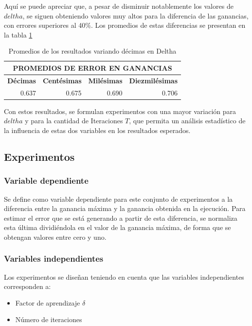 Aquí se puede apreciar que, a pesar de disminuir notablemente los valores de $deltha$, se siguen obteniendo valores muy altos para la diferencia de las ganancias, con errores superiores al 40\%. Los promedios de estas diferencias se presentan en la tabla \ref{delthas_0000}

\begin{table}[H]
\centering
\caption{Promedios de los resultados variando décimas en Deltha}
\begin{tabular}{llll} \\ \hline  
\multicolumn{4}{c}{\textbf{PROMEDIOS DE ERROR EN GANANCIAS}}                                                  \\ \hline  
\textbf{Décimas}          & \textbf{Centésimas}       & \textbf{Milésimas}        & \textbf{Diezmilésimas}    \\ \hline  
\multicolumn{1}{r}{0.637} & \multicolumn{1}{r}{0.675} & \multicolumn{1}{r}{0.690} & \multicolumn{1}{r}{0.706} \\ \hline  
\end{tabular}
\label{delthas_0000}
\end{table}

Con estos resultados, se formulan experimentos con una mayor variación para $deltha$ y para la cantidad de Iteraciones $T$, que permita un análisis estadístico de la influencia de estas dos variables en los resultados esperados.

\subsection{Experimentos}

\subsubsection{Variable dependiente}

Se define como variable dependiente para este conjunto de experimentos a la diferencia entre la ganancia máxima y la ganancia obtenida en la ejecución. Para estimar el error que se está generando a partir de esta diferencia, se normaliza esta última dividiéndola en el valor de la ganancia máxima, de forma que se obtengan valores entre cero y uno.

\subsubsection{Variables independientes}
Los experimentos se diseñan teniendo en cuenta que las variables independientes corresponden a: 
\begin{itemize}
    \item Factor de aprendizaje $\delta$
    \item Número de iteraciones
\end{itemize}

